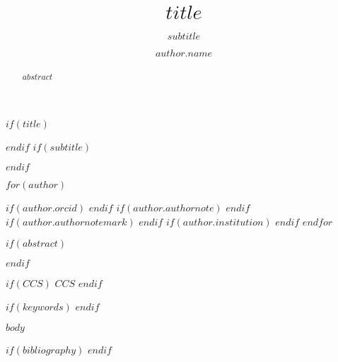 \documentclass[manuscript,screen,review,anonymous]{acmart}
\begin{document}

$if(title)$
  \title{$title$}
$endif$
$if(subtitle)$
  \subtitle{$subtitle$}
$endif$

$for(author)$
\author{$author.name$}
$if(author.orcid)$
$endif$
$if(author.authornote)$
$endif$
$if(author.authornotemark)$
$endif$
$if(author.institution)$
$endif$
$endfor$

$if(abstract)$
\begin{abstract}
$abstract$
\end{abstract}
$endif$

\renewcommand{\shortauthors}{$shortauthors$}

\maketitle

$if(CCS)$
$CCS$
$endif$

$if(keywords)$
$endif$


$body$


$if(bibliography)$
$endif$
\end{document}
